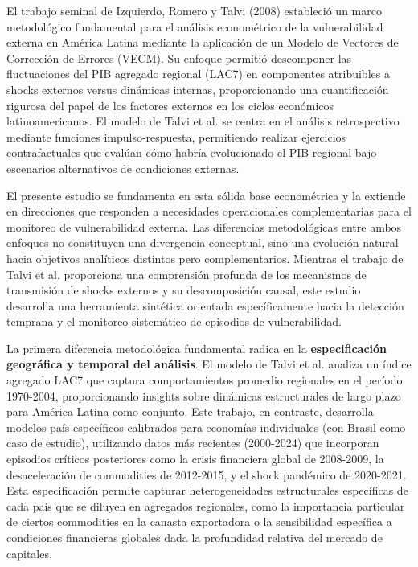 \documentclass[3p,11pt]{elsarticle}
\begin{document}
El trabajo seminal de Izquierdo, Romero y Talvi (2008) estableció un marco metodológico fundamental para el análisis econométrico de la vulnerabilidad externa en América Latina mediante la aplicación de un Modelo de Vectores de Corrección de Errores (VECM). Su enfoque permitió descomponer las fluctuaciones del PIB agregado regional (LAC7) en componentes atribuibles a shocks externos versus dinámicas internas, proporcionando una cuantificación rigurosa del papel de los factores externos en los ciclos económicos latinoamericanos. El modelo de Talvi et al. se centra en el análisis retrospectivo mediante funciones impulso-respuesta, permitiendo realizar ejercicios contrafactuales que evalúan cómo habría evolucionado el PIB regional bajo escenarios alternativos de condiciones externas.

El presente estudio se fundamenta en esta sólida base econométrica y la extiende en direcciones que responden a necesidades operacionales complementarias para el monitoreo de vulnerabilidad externa. Las diferencias metodológicas entre ambos enfoques no constituyen una divergencia conceptual, sino una evolución natural hacia objetivos analíticos distintos pero complementarios. Mientras el trabajo de Talvi et al. proporciona una comprensión profunda de los mecanismos de transmisión de shocks externos y su descomposición causal, este estudio desarrolla una herramienta sintética orientada específicamente hacia la detección temprana y el monitoreo sistemático de episodios de vulnerabilidad.

La primera diferencia metodológica fundamental radica en la \textbf{especificación geográfica y temporal del análisis}. El modelo de Talvi et al. analiza un índice agregado LAC7 que captura comportamientos promedio regionales en el período 1970-2004, proporcionando insights sobre dinámicas estructurales de largo plazo para América Latina como conjunto. Este trabajo, en contraste, desarrolla modelos país-específicos calibrados para economías individuales (con Brasil como caso de estudio), utilizando datos más recientes (2000-2024) que incorporan episodios críticos posteriores como la crisis financiera global de 2008-2009, la desaceleración de commodities de 2012-2015, y el shock pandémico de 2020-2021. Esta especificación permite capturar heterogeneidades estructurales específicas de cada país que se diluyen en agregados regionales, como la importancia particular de ciertos commodities en la canasta exportadora o la sensibilidad específica a condiciones financieras globales dada la profundidad relativa del mercado de capitales.
\end{document}
